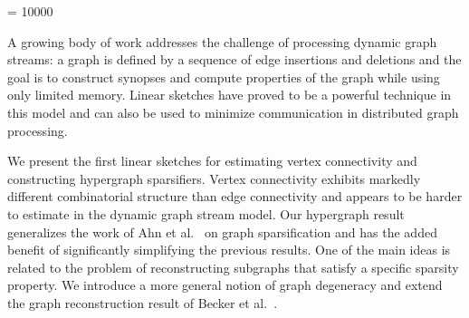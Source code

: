 \let\crnotice\mycrnotice%
\let\confname\myconfname%


\widowpenalty = 10000



\maketitle

\fi

A growing body of work addresses the challenge of processing dynamic graph streams: a graph is defined by a sequence of edge insertions and deletions and the goal is to construct synopses and compute properties of the graph while using only limited memory. 
Linear sketches have proved to be a powerful technique in this model and can also be used  to minimize communication in distributed graph processing. 

We present the first linear sketches for estimating vertex connectivity and constructing hypergraph sparsifiers. 
Vertex connectivity exhibits markedly different combinatorial structure than edge connectivity and appears to be harder to estimate in the dynamic graph stream model. Our hypergraph result generalizes the work of Ahn et al.~\cite{AhnGM12a} on graph sparsification and has the added benefit of significantly simplifying the previous results. One of the main ideas is related to the problem of reconstructing subgraphs that satisfy a specific sparsity property. We introduce a more general notion of graph degeneracy and extend the graph reconstruction result of Becker et al.~\cite{BeckerMNRST11}.

